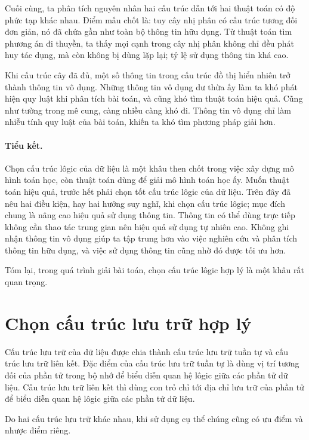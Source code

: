 \documentclass[11pt]{article}
\begin{document}
Cuối cùng, ta phân tích nguyên nhân hai cấu trúc dẫn tới hai thuật toán có độ
phức tạp khác nhau. Điểm mấu chốt là: tuy cây nhị phân có cấu trúc tương đối
đơn giản, nó đã chứa gần như toàn bộ thông tin hữu dụng. Từ thuật toán tìm
phương án đi thuyền, ta thấy mọi cạnh trong cây nhị phân không chỉ đều phát
huy tác dụng, mà còn không bị dùng lặp lại; tỷ lệ sử dụng thông tin khá cao.

Khi cấu trúc cây đã đủ, một số thông tin trong cấu trúc đồ thị hiển nhiên trở
thành thông tin vô dụng. Những thông tin vô dụng dư thừa ấy làm ta khó phát
hiện quy luật khi phân tích bài toán, và cũng khó tìm thuật toán hiệu quả.
Cũng như tường trong mê cung, càng nhiều càng khó đi. Thông tin vô dụng chỉ
làm nhiễu tính quy luật của bài toán, khiến ta khó tìm phương pháp giải hơn.

\paragraph{Tiểu kết.}
Chọn cấu trúc lôgic của dữ liệu là một khâu then chốt trong việc xây dựng mô
hình toán học, còn thuật toán dùng để giải mô hình toán học ấy. Muốn thuật
toán hiệu quả, trước hết phải chọn tốt cấu trúc lôgic của dữ liệu. Trên đây
đã nêu hai điều kiện, hay hai hướng suy nghĩ, khi chọn cấu trúc lôgic; mục
đích chung là nâng cao hiệu quả sử dụng thông tin. Thông tin có thể dùng trực
tiếp không cần thao tác trung gian nên hiệu quả sử dụng tự nhiên cao. Không
ghi nhận thông tin vô dụng giúp ta tập trung hơn vào việc nghiên cứu và phân
tích thông tin hữu dụng, và việc sử dụng thông tin cũng nhờ đó được tối ưu
hơn.

Tóm lại, trong quá trình giải bài toán, chọn cấu trúc lôgic hợp lý là một
khâu rất quan trọng.

\section{Chọn cấu trúc lưu trữ hợp lý}

Cấu trúc lưu trữ của dữ liệu được chia thành cấu trúc lưu trữ tuần tự và cấu
trúc lưu trữ liên kết. Đặc điểm của cấu trúc lưu trữ tuần tự là dùng vị trí
tương đối của phần tử trong bộ nhớ để biểu diễn quan hệ lôgic giữa các phần
tử dữ liệu. Cấu trúc lưu trữ liên kết thì dùng con trỏ chỉ tới địa chỉ lưu
trữ của phần tử để biểu diễn quan hệ lôgic giữa các phần tử dữ liệu.

Do hai cấu trúc lưu trữ khác nhau, khi sử dụng cụ thể chúng cũng có ưu điểm
và nhược điểm riêng.
\end{document}
